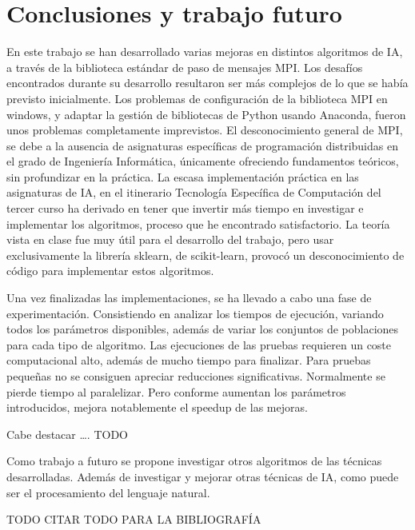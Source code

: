 \chapter{Conclusiones y trabajo futuro}
\label{cap:c5_conclu}

	En este trabajo se han desarrollado varias mejoras en distintos algoritmos de IA, a través de la biblioteca estándar de paso de mensajes MPI.
	Los desafíos encontrados durante su desarrollo resultaron ser más complejos de lo que se había previsto inicialmente. Los problemas de configuración de la biblioteca MPI en windows, y adaptar la gestión de bibliotecas de Python usando Anaconda, fueron unos problemas completamente imprevistos. El desconocimiento general de  MPI, se debe a la ausencia de asignaturas específicas de programación distribuidas en el grado de Ingeniería Informática, únicamente ofreciendo fundamentos teóricos, sin profundizar en la práctica. 
	La escasa implementación práctica en las asignaturas de IA, en el itinerario Tecnología Específica de Computación del tercer curso ha derivado en tener que invertir más tiempo en investigar e implementar los algoritmos, proceso que he encontrado satisfactorio. La teoría vista en clase fue muy útil para el desarrollo del trabajo, pero usar exclusivamente la librería sklearn, de scikit-learn, provocó un desconocimiento de código para implementar estos algoritmos.
	
	Una vez finalizadas las implementaciones, se ha llevado a cabo una fase de experimentación. Consistiendo en analizar los tiempos de ejecución, variando todos los parámetros disponibles, además de variar los conjuntos de poblaciones para cada tipo de algoritmo.
	Las ejecuciones de las pruebas requieren un coste computacional alto, además de mucho tiempo para finalizar. Para pruebas pequeñas no se consiguen apreciar reducciones significativas. Normalmente se pierde tiempo al paralelizar. Pero conforme aumentan los parámetros introducidos, mejora notablemente el speedup de las mejoras.
	
	\color{blue} Cabe destacar …. TODO \color{black}%
	
	
	
	Como trabajo a futuro se propone investigar otros algoritmos de las técnicas desarrolladas. Además de investigar y mejorar otras técnicas de IA, como puede ser el procesamiento del lenguaje natural.
	
	
	
	\huge \color{blue} TODO CITAR TODO PARA LA BIBLIOGRAFÍA
	\color{black}
	\normalsize
	
	